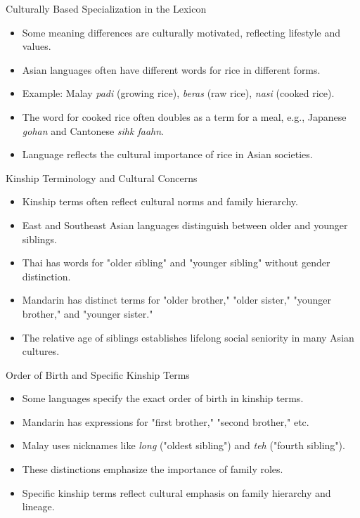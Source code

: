 \documentclass{beamer}
\begin{document}
\begin{frame}{Culturally Based Specialization in the Lexicon}
    \begin{itemize}
        \item Some meaning differences are culturally motivated, reflecting lifestyle and values.
        \item Asian languages often have different words for rice in different forms.
        \item Example: Malay \textit{padi} (growing rice), \textit{beras} (raw rice), \textit{nasi} (cooked rice).
        \item The word for cooked rice often doubles as a term for a meal, e.g., Japanese \textit{gohan} and Cantonese \textit{sihk faahn}.
        \item Language reflects the cultural importance of rice in Asian societies.
    \end{itemize}
\end{frame}

\begin{frame}{Kinship Terminology and Cultural Concerns}
    \begin{itemize}
        \item Kinship terms often reflect cultural norms and family hierarchy.
        \item East and Southeast Asian languages distinguish between older and younger siblings.
        \item Thai has words for "older sibling" and "younger sibling" without gender distinction.
        \item Mandarin has distinct terms for "older brother," "older sister," "younger brother," and "younger sister."
        \item The relative age of siblings establishes lifelong social seniority in many Asian cultures.
    \end{itemize}
\end{frame}

\begin{frame}{Order of Birth and Specific Kinship Terms}
    \begin{itemize}
        \item Some languages specify the exact order of birth in kinship terms.
        \item Mandarin has expressions for "first brother," "second brother," etc.
        \item Malay uses nicknames like \textit{long} ("oldest sibling") and \textit{teh} ("fourth sibling").
        \item These distinctions emphasize the importance of family roles.
        \item Specific kinship terms reflect cultural emphasis on family hierarchy and lineage.
    \end{itemize}
\end{frame}
\end{document}
